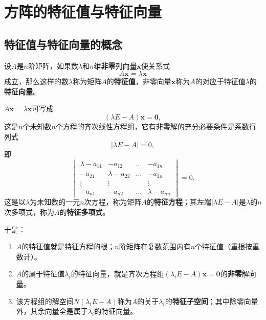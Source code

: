 

\section{方阵的特征值与特征向量}

\subsection{特征值与特征向量的概念}
\begin{definition}
设$A$是$n$阶矩阵，如果数$\lambda$和$n$维\textbf{非零}列向量$\boldsymbol{x}$使关系式
\[
A\boldsymbol{x}=\lambda\boldsymbol{x}
\]
成立，那么这样的数$\lambda$称为矩阵$A$的\textbf{特征值}，非零向量$\boldsymbol{x}$称为$A$的对应于特征值$\lambda$的\textbf{特征向量}。
\end{definition}

$A\boldsymbol{x}=\lambda\boldsymbol{x}$可写成
\[
(\lambda E-A)\boldsymbol{x}=\boldsymbol{0},
\]
这是$n$个未知数$n$个方程的齐次线性方程组，它有非零解的充分必要条件是系数行列式
\[
|\lambda E-A|=0,
\]
即
\[
\begin{vmatrix}
\lambda-a_{11}&-a_{12}&\dots&-a_{1n}\\
-a_{21}&\lambda-a_{22}&\dots&-a_{2n}\\
\vdots&\vdots&&\vdots\\
-a_{n1}&-a_{n2}&\dots&\lambda-a_{nn}
\end{vmatrix}=0 .
\]
这是以$\lambda$为未知数的一元$n$次方程，称为矩阵$A$的\textbf{特征方程}；其左端$|\lambda E-A|$是$\lambda$的$n$次多项式，称为$A$的\textbf{特征多项式}。

于是：
\begin{enumerate}
    \item $A$的特征值就是特征方程的根；$n$阶矩阵在复数范围内有$n$个特征值（重根按重数计）。
    \item $A$的属于特征值$\lambda_i$的特征向量，就是齐次方程组$(\lambda_iE-A)\boldsymbol{x}=\boldsymbol{0}$的\textbf{非零}解向量。
    \item 该方程组的解空间$N(\lambda_iE-A)$称为$A$的关于$\lambda_i$的\textbf{特征子空间}；其中除零向量外，其余向量全是属于$\lambda_i$的特征向量。
\end{enumerate}

